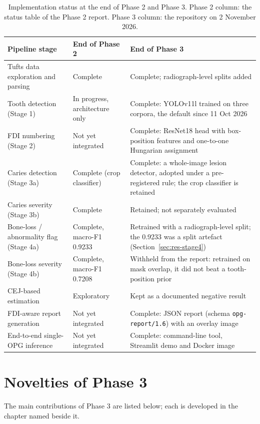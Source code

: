 \begin{table}[H]
\centering
\caption{Implementation status at the end of Phase 2 and Phase 3. Phase 2 column: the status table
of the Phase 2 report. Phase 3 column: the repository on 2 November 2026.}
\label{tab:phase-status}
\small
\begin{tabularx}{\textwidth}{@{}L{4.6cm}L{3.3cm}Y@{}}
\toprule
Pipeline stage & End of Phase 2 & End of Phase 3\\
\midrule
Tufts data exploration and parsing & Complete & Complete; radiograph-level splits added\\
Tooth detection (Stage 1) & In progress, architecture only & Complete: YOLOv11l trained on three corpora, the default since 11 Oct 2026\\
FDI numbering (Stage 2) & Not yet integrated & Complete: ResNet18 head with box-position features and one-to-one Hungarian assignment\\
Caries detection (Stage 3a) & Complete (crop classifier) & Complete: a whole-image lesion detector, adopted under a pre-registered rule; the crop classifier is retained\\
Caries severity (Stage 3b) & Complete & Retained; not separately evaluated\\
Bone-loss / abnormality flag (Stage 4a) & Complete, macro-F1 0.9233 & Retrained with a radiograph-level split; the 0.9233 was a split artefact (Section~\ref{sec:res-stage4})\\
Bone-loss severity (Stage 4b) & Complete, macro-F1 0.7208 & Withheld from the report: retrained on mask overlap, it did not beat a tooth-position prior\\
CEJ-based estimation & Exploratory & Kept as a documented negative result\\
FDI-aware report generation & Not yet integrated & Complete: JSON report (schema \texttt{opg-report/1.6}) with an overlay image\\
End-to-end single-OPG inference & Not yet integrated & Complete: command-line tool, Streamlit demo and Docker image\\
\bottomrule
\end{tabularx}
\end{table}

\section{Novelties of Phase 3}
\label{sec:novelties}

The main contributions of Phase 3 are listed below; each is developed in the chapter named beside
it.

